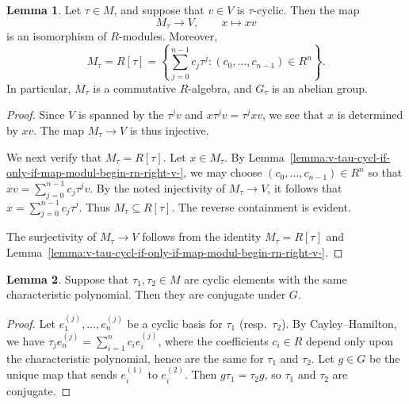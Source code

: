 \documentclass[reqno]{amsart}
\theoremstyle{plain} \newtheorem{theorem} {Theorem} \newtheorem{conjecture} {Conjecture} \newtheorem{corollary} [theorem] {Corollary} \newtheorem{proposition} [theorem] {Proposition} \newtheorem{fact} [theorem] {Fact}
\theoremstyle{definition} \newtheorem{definition} [theorem] {Definition}
\theoremstyle{itplain} %
\newtheorem{lemma}[theorem]{Lemma}
\begin{document}
\begin{lemma}\label{lemma:centralizer-description}
  Let $\tau \in M$, and suppose that $v \in V$ is $\tau$-cyclic.  Then the map
  \begin{equation*}
    M_\tau \rightarrow V, \qquad x \mapsto x v
  \end{equation*}
  is an isomorphism of $R$-modules.  Moreover,
  \begin{equation*}
    M_\tau = R[\tau] = \left\{ \sum_{j=0}^{n-1} c_j \tau^j : (c_0,\dotsc,c_{n-1}) \in R^{n} \right\}.
  \end{equation*}
  In particular, $M_\tau$ is a commutative $R$-algebra, and $G_\tau$ is an abelian group.
\end{lemma}
\begin{proof}
  Since $V$ is spanned by the $\tau^j v$ and $x \tau^j v = \tau^j x v$, we see that $x$ is determined by $x v$.  The map $M_\tau \rightarrow V$ is thus injective.

  We next verify that $M_\tau = R[\tau]$.  Let $x \in M_\tau$.  By Lemma~\ref{lemma:v-tau-cycl-if-only-if-map-modul-begin-rn-right-v-}, we may choose $(c_0,\dotsc,c_{n-1}) \in R^n$ so that $x v = \sum _{j=0}^{n-1} c_j \tau^j v$.  By the noted injectivity of $M_\tau \rightarrow V$, it follows that $x = \sum_{j=0}^{n-1} c_j \tau^j$.  Thus $M_\tau \subseteq R[\tau]$.  The reverse containment is evident.

  The surjectivity of $M_\tau \rightarrow V$ follows from the identity $M_\tau = R[\tau]$ and Lemma~\ref{lemma:v-tau-cycl-if-only-if-map-modul-begin-rn-right-v-}.
\end{proof}



\begin{lemma}\label{lemma:regular-elements-same-characteristic-polynomial-are-conjugate}
  Suppose that $\tau_1, \tau_2 \in M$ are cyclic elements with the same characteristic polynomial.  Then they are conjugate under $G$.
\end{lemma}
\begin{proof}
  Let $e_1^{(j)},\dotsc,e_n^{(j)}$ be a cyclic basis for $\tau_1$ (resp.\ $\tau_2$).  By Cayley--Hamilton, we have $\tau_j e_n^{(j)} = \sum_{i=1}^{n} c_i e_i^{(j)}$, where the coefficients $c_i \in R$ depend only upon the characteristic polynomial, hence are the same for $\tau_1$ and $\tau_2$.  Let $g \in G$ be the unique map that sends $e_i^{(1)}$ to $e_i^{(2)}$.  Then $g \tau_1 = \tau_2 g$, so $\tau_1$ and $\tau_2$ are conjugate.
\end{proof}
\end{document}
